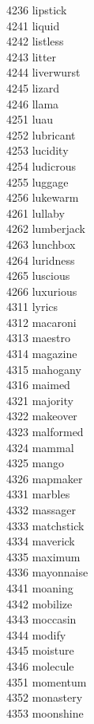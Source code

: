 4236 lipstick \\
4241 liquid \\
4242 listless \\
4243 litter \\
4244 liverwurst \\
4245 lizard \\
4246 llama \\
4251 luau \\
4252 lubricant \\
4253 lucidity \\
4254 ludicrous \\
4255 luggage \\
4256 lukewarm \\
4261 lullaby \\
4262 lumberjack \\
4263 lunchbox \\
4264 luridness \\
4265 luscious \\
4266 luxurious \\
4311 lyrics \\
4312 macaroni \\
4313 maestro \\
4314 magazine \\
4315 mahogany \\
4316 maimed \\
4321 majority \\
4322 makeover \\
4323 malformed \\
4324 mammal \\
4325 mango \\
4326 mapmaker \\
4331 marbles \\
4332 massager \\
4333 matchstick \\
4334 maverick \\
4335 maximum \\
4336 mayonnaise \\
4341 moaning \\
4342 mobilize \\
4343 moccasin \\
4344 modify \\
4345 moisture \\
4346 molecule \\
4351 momentum \\
4352 monastery \\
4353 moonshine \\
